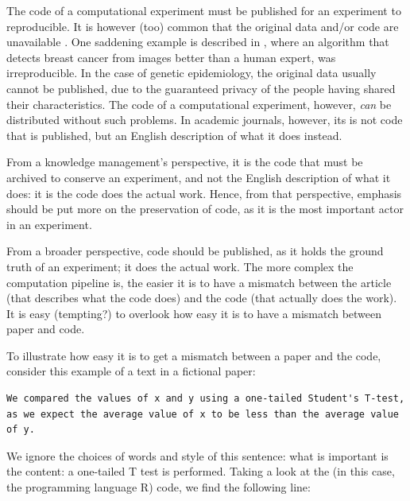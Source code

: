 The code of a computational experiment must be published
for an experiment to reproducible.
It is however (too) common that the original data
and/or code are unavailable \cite{peng2021reproducible}.
One saddening example is described in \cite{haibe2020importance}, where
an algorithm that detects breast cancer from images better than a human expert,
was irreproducible.
In the case of genetic epidemiology, 
the original data usually cannot be published, 
due to the guaranteed privacy of the people having shared their characteristics.
The code of a computational experiment, however, \emph{can} be
distributed without such problems.
In academic journals, however, its is not code that is published, 
but an English description of what it does instead.

From a knowledge management's perspective,
it is the code that must be archived 
to conserve an experiment,
and not the
English description of what it does:
it is the code does the actual work.
Hence, from that perspective, emphasis should be
put more on the preservation of code, as it is the most important actor
in an experiment.


From a broader perspective, code should be published, as it holds the
ground truth of an experiment; it does the actual work.
The more complex the computation pipeline is, the easier it is
to have a mismatch between the article (that describes what the
code does) and the code (that actually does the work).
It is easy (tempting?) to overlook how easy it is to have a mismatch
between paper and code.

To illustrate how easy it is to get a mismatch between a paper
and the code, consider this example
of a text in a fictional paper:

\begin{verbatim}
We compared the values of x and y using a one-tailed Student's T-test,
as we expect the average value of x to be less than the average value of y.
\end{verbatim}

We ignore the choices of words and style of this sentence: what is
important is the content: a one-tailed T test is performed.
Taking a look at the (in this case, the programming language R) code, 
we find the following line:

